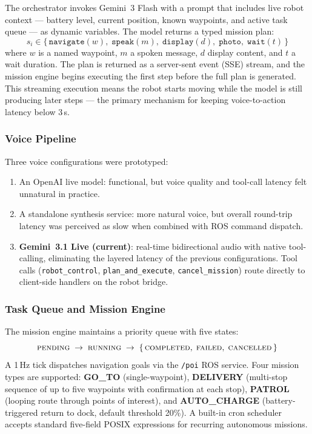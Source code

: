 \documentclass[11pt,a4paper]{article}
\begin{document}
The orchestrator invokes Gemini~3 Flash with a prompt that includes live robot context --- battery level, current position, known waypoints, and active task queue --- as dynamic variables. The model returns a typed mission plan:
\begin{equation}
  s_i \in \{\,\texttt{navigate}(w),\;\texttt{speak}(m),\;\texttt{display}(d),\;\texttt{photo},\;\texttt{wait}(t)\,\}
\end{equation}
where $w$ is a named waypoint, $m$ a spoken message, $d$ display content, and $t$ a wait duration. The plan is returned as a server-sent event (SSE) stream, and the mission engine begins executing the first step before the full plan is generated. This streaming execution means the robot starts moving while the model is still producing later steps --- the primary mechanism for keeping voice-to-action latency below 3\,s.

\subsubsection{Voice Pipeline}

Three voice configurations were prototyped:
\begin{enumerate}
  \item An OpenAI live model: functional, but voice quality and tool-call latency felt unnatural in practice.
  \item A standalone synthesis service: more natural voice, but overall round-trip latency was perceived as slow when combined with ROS command dispatch.
  \item \textbf{Gemini~3.1 Live (current)}: real-time bidirectional audio with native tool-calling, eliminating the layered latency of the previous configurations. Tool calls (\texttt{robot\_control}, \texttt{plan\_and\_execute}, \texttt{cancel\_mission}) route directly to client-side handlers on the robot bridge.
\end{enumerate}

\subsubsection{Task Queue and Mission Engine}

The mission engine maintains a priority queue with five states:
\[
\textsc{pending} \;\to\; \textsc{running} \;\to\; \{\,\textsc{completed},\;\textsc{failed},\;\textsc{cancelled}\,\}
\]
A 1\,Hz tick dispatches navigation goals via the \texttt{/poi} ROS service. Four mission types are supported: \textbf{GO\_TO} (single-waypoint), \textbf{DELIVERY} (multi-stop sequence of up to five waypoints with confirmation at each stop), \textbf{PATROL} (looping route through points of interest), and \textbf{AUTO\_CHARGE} (battery-triggered return to dock, default threshold 20\%). A built-in cron scheduler accepts standard five-field POSIX expressions for recurring autonomous missions.
\end{document}
